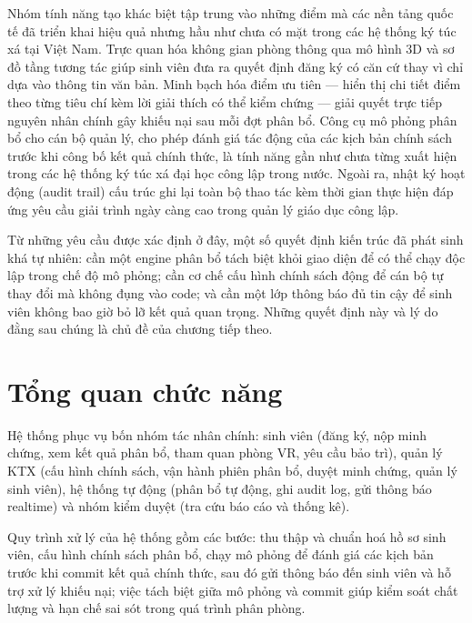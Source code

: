 \documentclass[../DoAn.tex]{subfiles}
\begin{document}
Nhóm tính năng tạo khác biệt tập trung vào những điểm mà các nền tảng quốc tế
đã triển khai hiệu quả nhưng hầu như chưa có mặt trong các hệ thống ký túc xá
tại Việt Nam. Trực quan hóa không gian phòng thông qua mô hình 3D và sơ đồ tầng
tương tác giúp sinh viên đưa ra quyết định đăng ký có căn cứ thay vì chỉ dựa
vào thông tin văn bản. Minh bạch hóa điểm ưu tiên --- hiển thị chi tiết điểm
theo từng tiêu chí kèm lời giải thích có thể kiểm chứng --- giải quyết trực tiếp
nguyên nhân chính gây khiếu nại sau mỗi đợt phân bổ. Công cụ mô phỏng phân bổ
cho cán bộ quản lý, cho phép đánh giá tác động của các kịch bản chính sách trước
khi công bố kết quả chính thức, là tính năng gần như chưa từng xuất hiện trong
các hệ thống ký túc xá đại học công lập trong nước. Ngoài ra, nhật ký hoạt động
(audit trail) cấu trúc ghi lại toàn bộ thao tác kèm thời gian thực hiện đáp ứng
yêu cầu giải trình ngày càng cao trong quản lý giáo dục công lập.

Từ những yêu cầu được xác định ở đây, một số quyết định kiến trúc đã phát sinh
khá tự nhiên: cần một engine phân bổ tách biệt khỏi giao diện để có thể chạy
độc lập trong chế độ mô phỏng; cần cơ chế cấu hình chính sách động để cán bộ
tự thay đổi mà không đụng vào code; và cần một lớp thông báo đủ tin cậy để
sinh viên không bao giờ bỏ lỡ kết quả quan trọng. Những quyết định này và lý
do đằng sau chúng là chủ đề của chương tiếp theo.


\section{Tổng quan chức năng}
\label{sec:functional}

Hệ thống phục vụ bốn nhóm tác nhân chính: sinh viên (đăng ký, nộp minh chứng,
xem kết quả phân bổ, tham quan phòng VR, yêu cầu bảo trì), quản lý KTX (cấu
hình chính sách, vận hành phiên phân bổ, duyệt minh chứng, quản lý sinh viên),
hệ thống tự động (phân bổ tự động, ghi audit log, gửi thông báo realtime) và
nhóm kiểm duyệt (tra cứu báo cáo và thống kê).

Quy trình xử lý của hệ thống gồm các bước: thu thập và chuẩn hoá hồ sơ sinh
viên, cấu hình chính sách phân bổ, chạy mô phỏng để đánh giá các kịch bản
trước khi commit kết quả chính thức, sau đó gửi thông báo đến sinh viên và hỗ
trợ xử lý khiếu nại; việc tách biệt giữa mô phỏng và commit giúp kiểm soát
chất lượng và hạn chế sai sót trong quá trình phân phòng.
\end{document}
